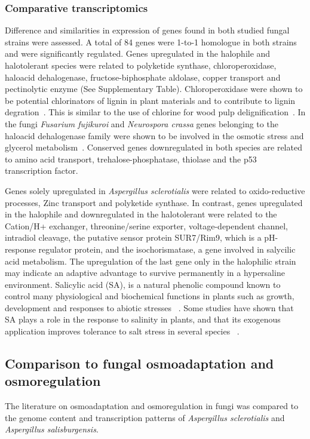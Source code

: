 \documentclass[jof,article,submit,moreauthors,pdftex,10pt,a4paper]{Definitions/mdpi}
\newcommand{\phiSp}{\textit{Aspergillus salisburgensis}}
\newcommand{\phiScl}{\textit{Aspergillus sclerotialis}}
\begin{document}
\subsubsection{Comparative transcriptomics}
Difference and similarities in expression of genes found in both studied fungal strains were assessed. A total of 84 genes were 1-to-1 homologue in both strains and were significantly regulated. Genes upregulated in the halophile and halotolerant species were related to polyketide synthase, chloroperoxidase, haloacid dehalogenase, fructose-biphosphate aldolase, copper transport and pectinolytic enzyme (See Supplementary Table). Chloroperoxidase were shown to be potential chlorinators of lignin in plant materials and to contribute to lignin degration~\cite{OrtizBermudez2003}. This is similar to the use of chlorine for wood pulp delignification~\cite{dence1971halogenation}. In the fungi \textit{Fusarium fujikuroi} and \textit{Neurospora crassa} genes belonging to the haloacid dehalogenase family were shown to be involved in the osmotic stress and glycerol metabolism~\cite{Garcia-Martinez2014}. Conserved genes downregulated in both species are related to amino acid transport, trehalose-phosphatase, thiolase and the p53 transcription factor. 

Genes solely upregulated in \phiScl{} were related to oxido-reductive processes, Zinc transport and polyketide synthase. In contrast, genes upregulated in the halophile and downregulated in the halotolerant were related to the Cation/H+ exchanger, threonine/serine exporter, voltage-dependent channel, intradiol cleavage, the putative sensor protein SUR7/Rim9, which is a pH-response regulator protein,  and the isochorismatase, a gene involved in salycilic acid metabolism. The upregulation of the last gene only in the halophilic strain may indicate an adaptive advantage to survive permanently in a hypersaline environment. Salicylic acid (SA), is a natural phenolic compound known to control many physiological and biochemical functions in plants such as growth, development  and responses to abiotic stresses ~\cite{HaraM.FurukawaJ.SatoA.MizoguchiT.andMiura2012}. Some studies have shown that SA plays a role in the response to salinity  in plants, and that its exogenous application  improves tolerance to salt stress in several  species ~\cite{Miura2014}. 



\subsection{Comparison to fungal osmoadaptation and osmoregulation}
The literature on osmoadaptation and osmoregulation in fungi was compared to the genome content and transcription patterns of \phiScl{} and \phiSp{}. 
\end{document}
